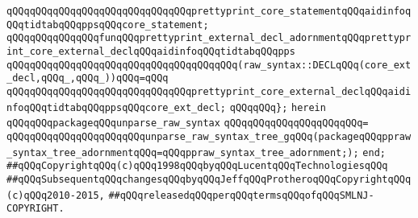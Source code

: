 \verb|qQQqqQQqqQQqqQQqqQQqqQQqqQQqqQQqprettyprint_core_statementqQQqaidinfoqQQqtidtabqQQqppsqQQqcore_statement;|\newline
\newline
\verb|qQQqqQQqqQQqqQQqfunqQQqprettyprint_external_decl_adornmentqQQqprettyprint_core_external_declqQQqaidinfoqQQqtidtabqQQqpps|\newline
\verb|qQQqqQQqqQQqqQQqqQQqqQQqqQQqqQQqqQQqqQQq(raw_syntax::DECLqQQq(core_ext_decl,qQQq_,qQQq_))qQQq=qQQq|\newline
\verb|qQQqqQQqqQQqqQQqqQQqqQQqqQQqqQQqprettyprint_core_external_declqQQqaidinfoqQQqtidtabqQQqppsqQQqcore_ext_decl;|\newline
\verb|qQQqqQQq};|\newline
\newline
\verb|herein|\newline
\verb|qQQqqQQqpackageqQQqunparse_raw_syntax|\newline
\verb|qQQqqQQqqQQqqQQqqQQqqQQq=|\newline
\verb|qQQqqQQqqQQqqQQqqQQqqQQqunparse_raw_syntax_tree_gqQQq(packageqQQqppraw_syntax_tree_adornmentqQQq=qQQqppraw_syntax_tree_adornment;);|\newline
\verb|end;|\newline
\newline
\newline
\verb|##qQQqCopyrightqQQq(c)qQQq1998qQQqbyqQQqLucentqQQqTechnologiesqQQq|\newline
\verb|##qQQqSubsequentqQQqchangesqQQqbyqQQqJeffqQQqProtheroqQQqCopyrightqQQq(c)qQQq2010-2015,|\newline
\verb|##qQQqreleasedqQQqperqQQqtermsqQQqofqQQqSMLNJ-COPYRIGHT.|\newline

